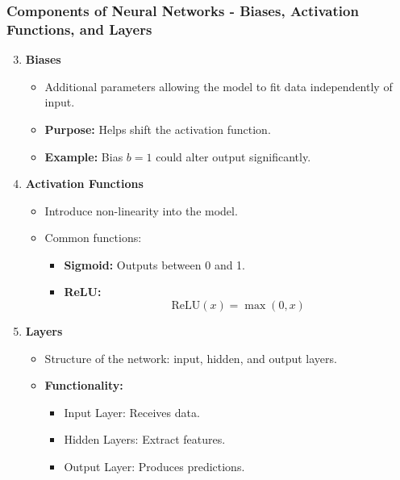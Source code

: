 \documentclass[aspectratio=169]{beamer}
\begin{document}
\begin{frame}[fragile]
    \frametitle{Components of Neural Networks - Biases, Activation Functions, and Layers}
    
    \begin{enumerate}
        \setcounter{enumi}{2}
        \item \textbf{Biases}
        \begin{itemize}
            \item Additional parameters allowing the model to fit data independently of input.
            \item \textbf{Purpose:} Helps shift the activation function.
            \item \textbf{Example:} Bias $b=1$ could alter output significantly.
        \end{itemize}

        \item \textbf{Activation Functions}
        \begin{itemize}
            \item Introduce non-linearity into the model.
            \item Common functions:
                \begin{itemize}
                    \item \textbf{Sigmoid:} Outputs between 0 and 1.
                    \item \textbf{ReLU:} 
                    \[
                    \text{ReLU}(x) = \max(0, x)
                    \] 
                \end{itemize}
        \end{itemize}

        \item \textbf{Layers}
        \begin{itemize}
            \item Structure of the network: input, hidden, and output layers.
            \item \textbf{Functionality:}
            \begin{itemize}
                \item Input Layer: Receives data.
                \item Hidden Layers: Extract features.
                \item Output Layer: Produces predictions.
            \end{itemize}
        \end{itemize}
    \end{enumerate}
\end{frame}
\end{document}
